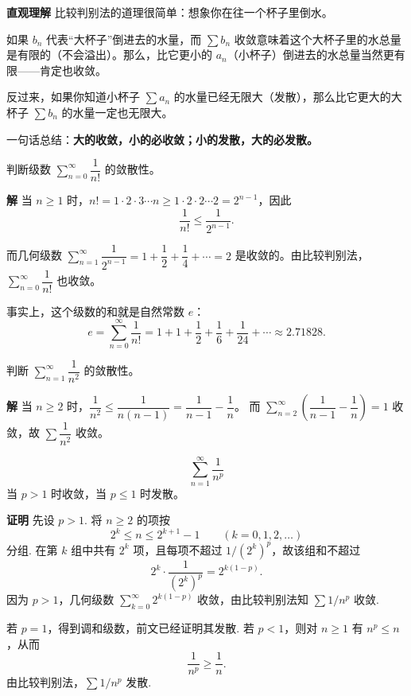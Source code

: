 \documentclass[fontset=fandol]{ctexart}
\newenvironment{custom}[1]{\par\noindent\textbf{#1}\quad}{\par\vspace{0.8em}}
\begin{document}
\begin{custom}{直观理解}
比较判别法的道理很简单：想象你在往一个杯子里倒水。

如果 \(b_n\) 代表“大杯子”倒进去的水量，而 \(\sum b_n\) 收敛意味着这个大杯子里的水总量是有限的（不会溢出）。那么，比它更小的 \(a_n\)（小杯子）倒进去的水总量当然更有限——肯定也收敛。

反过来，如果你知道小杯子 \(\sum a_n\) 的水量已经无限大（发散），那么比它更大的大杯子 \(\sum b_n\) 的水量一定也无限大。

一句话总结：\textbf{大的收敛，小的必收敛；小的发散，大的必发散。}
\end{custom}

\begin{example}
判断级数 \(\sum_{n=0}^{\infty} \dfrac{1}{n!}\) 的敛散性。
\end{example}

\begin{custom}{解}
当 \(n \geq 1\) 时，\(n! = 1 \cdot 2 \cdot 3 \cdots n \geq 1 \cdot 2 \cdot 2 \cdots 2 = 2^{n-1}\)，因此
\[
\dfrac{1}{n!} \leq \dfrac{1}{2^{n-1}}.
\]

而几何级数 \(\sum_{n=1}^{\infty} \dfrac{1}{2^{n-1}} = 1 + \dfrac12 + \dfrac14 + \cdots = 2\) 是收敛的。由比较判别法，\(\sum_{n=0}^{\infty} \dfrac{1}{n!}\) 也收敛。

事实上，这个级数的和就是自然常数 \(e\)：
\[
e = \sum_{n=0}^{\infty} \dfrac{1}{n!} = 1 + 1 + \dfrac12 + \dfrac16 + \dfrac{1}{24} + \cdots \approx 2.71828.
\]
\end{custom}

\begin{example}
判断 \(\sum_{n=1}^{\infty} \dfrac{1}{n^2}\) 的敛散性。
\end{example}
\begin{custom}{解}
当 \(n \geq 2\) 时，\(\dfrac{1}{n^2} \leq \dfrac{1}{n(n-1)} = \dfrac{1}{n-1} - \dfrac{1}{n}\)。
而 \(\sum_{n=2}^{\infty} \left(\dfrac{1}{n-1} - \dfrac{1}{n}\right) = 1\) 收敛，故 \(\sum \dfrac{1}{n^2}\) 收敛。
\end{custom}

\begin{theorem}[\(p\)-级数]
\[
\sum_{n=1}^{\infty} \dfrac{1}{n^p}
\]
当 \(p > 1\) 时收敛，当 \(p \leq 1\) 时发散。
\end{theorem}

\begin{custom}{证明}
先设 $p>1$. 将 $n\ge2$ 的项按
\[
2^k\le n\le 2^{k+1}-1\qquad(k=0,1,2,\ldots)
\]
分组. 在第 $k$ 组中共有 $2^k$ 项，且每项不超过 $1/(2^k)^p$，故该组和不超过
\[
2^k\cdot \frac{1}{(2^k)^p}=2^{k(1-p)}.
\]
因为 $p>1$，几何级数 $\sum_{k=0}^{\infty}2^{k(1-p)}$ 收敛，由比较判别法知 $\sum 1/n^p$ 收敛.

若 $p=1$，得到调和级数，前文已经证明其发散. 若 $p<1$，则对 $n\ge1$ 有 $n^p\le n$，从而
\[
\frac1{n^p}\ge \frac1n.
\]
由比较判别法，$\sum 1/n^p$ 发散.
\end{custom}
\end{document}
